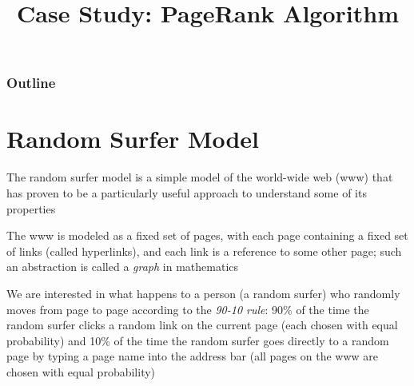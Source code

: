 \documentclass[8pt,a4paper,compress]{beamer}
\title{Case Study: PageRank Algorithm}
\date{}
\begin{document}
\begin{frame}
\vfill
\titlepage
\end{frame}

\begin{frame}
\frametitle{Outline}
\tableofcontents
\end{frame}

\section{Random Surfer Model}
\begin{frame}[fragile]
The random surfer model is a simple model of the world-wide web (www) that has proven to be a particularly useful approach to understand some of its properties

\bigskip

The www is modeled as a fixed set of pages, with each page containing a fixed set of links (called hyperlinks), and each link is a reference to some other page; such an abstraction is called a \textit{graph} in mathematics

\bigskip

We are interested in what happens to a person (a random surfer) who randomly moves from page to page according to the \emph{90-10 rule}: 90\% of the time the random surfer clicks a random link on the current page (each chosen with equal probability) and 10\% of the time the random surfer goes directly to a random page by typing a page name into the address bar (all pages on the www are chosen with equal probability)
\end{frame}
\end{document}
